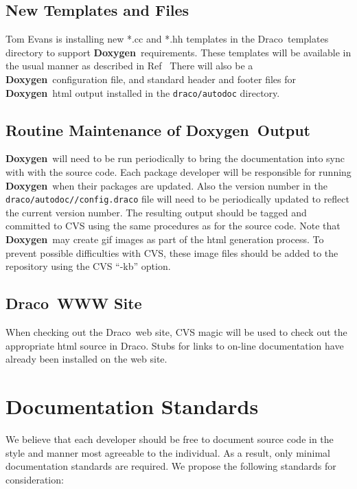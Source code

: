 \documentclass[11pt]{nmemo}
\newcommand{\draco}{{\normalfont\sffamily Draco}}
\newcommand{\doxy}{{\normalfont\bfseries Doxygen}}
\begin{document}
\subsection{New Templates and Files}

Tom Evans is installing new *.cc and *.hh templates in the \draco\ 
templates directory to support \doxy\ requirements. These templates
will be available in the usual manner as described in Ref~\cite{xtm:9909}
There will also be
a \doxy\ configuration file, and standard
header and footer files for \doxy\ html output installed in the 
\texttt{draco/autodoc} directory.
 

\subsection{Routine Maintenance of \doxy\ Output}


 \doxy\ will need to
be run periodically to bring the documentation into sync with with the
source code. 
Each package developer will be responsible for running
 \doxy\ when their packages are updated.
Also the version number in the \texttt{draco/autodoc//config.draco}
file will need to be periodically updated to reflect the current version number.
The resulting output should be tagged and committed to
CVS using the same procedures as for the source code. Note that
\doxy\ may create gif images as part of the html generation
process. To prevent possible difficulties with CVS, these image files
 should be added to the repository using the CVS ``-kb'' option. 

\subsection{\draco\ WWW Site}

When checking out the \draco\ web site, CVS magic will be used to
check out the appropriate html source in
\draco. Stubs for links to on-line documentation have already been
installed on the web site.



\section{Documentation Standards}

We believe that each developer should be free to document source code
in the style and manner most agreeable to the individual. As a result,
only minimal documentation standards are required.  We propose the
following standards for consideration:
\end{document}
